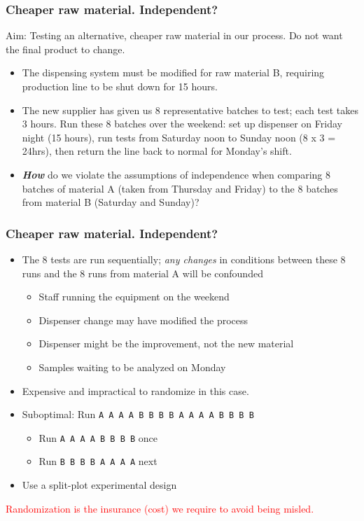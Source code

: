 \begin{frame}\frametitle{{\color{myOrange}{Side discussion:}} Cheaper raw material. Independent?}

	Aim: Testing an alternative, cheaper raw material in our process. Do not want the final product to change.
	\begin{itemize}
		\item	The dispensing system must be modified for raw material B, requiring production line to be shut down for 15 hours.
	\end{itemize}
	\begin{itemize}
		\item	The new supplier has given us 8 representative batches to test; each test takes 3 hours. Run these 8 batches over the weekend: set up dispenser on Friday night (15 hours), run tests from Saturday noon to Sunday noon (8 x 3 = 24hrs), then return the line back to normal for Monday's shift.
	\end{itemize}
	\begin{itemize}
		\item\textbf{\emph{How}} do we violate the assumptions of independence when comparing 8 batches of material A (taken from Thursday and Friday) to the 8 batches from material B (Saturday and Sunday)?
	\end{itemize}
\end{frame}

\begin{frame}\frametitle{{\color{myOrange}{Side discussion:}} Cheaper raw material. Independent?}
	\begin{itemize}
		\item	The 8 tests are run sequentially; \emph{any changes} in conditions between these 8 runs and the 8 runs from material A will be confounded
		\begin{itemize}
			\item	Staff running the equipment on the weekend
			\item	Dispenser change may have modified the process
			\item	Dispenser might be the improvement, not the new material
			\item	Samples waiting to be analyzed on Monday
		\end{itemize}
	\end{itemize}
	\begin{itemize}
		\item	Expensive and impractical to randomize in this case.
		\item	Suboptimal: Run \texttt{A A A A B B B B A A A A B B B B}
		\begin{itemize}
			\item	Run \texttt{A A A A B B B B} once
			\item	Run \texttt{B B B B A A A A} next
		\end{itemize}
		\item	Use a split-plot experimental design
	\end{itemize}

	\textcolor{red}{Randomization is the insurance (cost) we require to avoid being misled.}
\end{frame}

